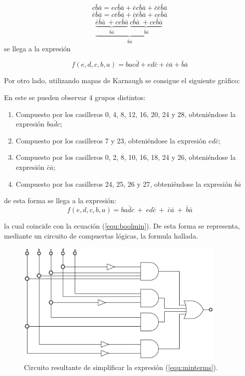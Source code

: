 \documentclass[a4paper]{article}
\begin{document}
\begin{center}
\[
		c\bar{b}\bar{a}= ec\bar{b}\bar{a}+\bar{e}c\bar{b}\bar{a}+\bar{c}\bar{e}\bar{b}\bar{a}
\]
\[
		\bar{e}\bar{b}\bar{a}=c\bar{e}\bar{b}\bar{a}+\bar{c}\bar{e}\bar{b}\bar{a}+ce\bar{b}\bar{a}
\]
\[
	\underbrace{\underbrace{\bar{e}\bar{b}\bar{a} \ + ce\bar{b}\bar{a}  }_{ \bar{b}\bar{a}}\ 
	\underbrace{c\bar{b}\bar{a} \ + ce\bar{b}\bar{a}  }_{ \bar{b}\bar{a}}\ }_{\bar{b}\bar{a}}
\]
se llega a la expresión

\begin{equation}
		f \left( e,d,c,b,a \right) =bac\bar{d}+ed\bar{c}+\bar{c}\bar{a}+\bar{b}\bar{a}
		\label{equ:boolmin}
\end{equation}
\end{center}

Por otro lado, utilizando mapas de Karnaugh se consigue el siguiente gráfico:



En este se pueden observar 4 grupos distintos:
\begin{enumerate}
	\item Compuesto por los casilleros 0, 4, 8, 12, 16, 20, 24 y 28, obteniéndose la expresión $ b a \bar{d} c $;
	\item Compuesto por los casilleros 7 y 23, obteniéndose la expresión $ e d \bar{c} $;
	\item Compuesto por los casilleros 0, 2, 8, 10, 16, 18, 24 y 26, obteniéndose la expresión $ \bar{c} \bar{a} $;
	\item Compuesto por los casilleros 24, 25, 26 y 27, obteniéndose la expresión $ \bar{b} \bar{a} $
\end{enumerate}

de esta forma se llega a la expresión:
\[
	f \left( e,d,c,b,a \right) = b a \bar{d} c \ + \  e d \bar{c} \ + \ \bar{c} \bar{a} \ + \ \bar{b} \bar{a}
\]


la cual coincide con la ecuación (\ref{equ:boolmin}). De esta forma se representa, mediante un circuito de compuertas lógicas, la formula hallada.

\begin{figure}[H]
	\centering
	\includegraphics[width=0.9\textwidth]{Circuito1.PNG}
\caption{Circuito resultante de simplificar la expresión (\ref{equ:minterms}).}
	\label{fig:circ1}
\end{figure}
\end{document}
